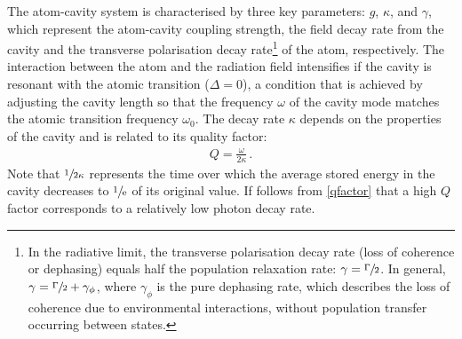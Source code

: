 \documentclass[../Thesis-IJspeert.tex]{subfiles}
\begin{document}
The atom-cavity system is characterised by three key parameters: $g$, $\kappa$, and $\gamma$, which represent the atom-cavity coupling strength, the field decay rate from the cavity and the transverse polarisation decay rate\footnote{In the radiative limit, the transverse polarisation decay rate (loss of coherence or dephasing) equals half the population relaxation rate: $\gamma=\sfrac{\Gamma}{2}$. In general, $\gamma=\sfrac{\Gamma}{2}+\gamma_\phi$, where $\gamma_\phi$ is the pure dephasing rate, which describes the loss of coherence due to environmental interactions, without population transfer occurring between states.} of the atom, respectively. The interaction between the atom and the radiation field intensifies if the cavity is resonant with the atomic transition ($\Delta=0$), a condition that is achieved by adjusting the cavity length so that the frequency $\omega$ of the cavity mode matches the atomic transition frequency $\omega_0$. The decay rate $\kappa$ depends on the properties of the cavity and is related to its quality factor:
\begin{align}
\label{qfactor}
	Q = \frac{\omega}{2\kappa}\,.
\end{align}
Note that $\sfrac{1}{2\kappa}$ represents the time over which the average stored energy in the cavity decreases to $\sfrac{1}{\mathrm{e}}$ of its original value. If follows from \autoref{qfactor} that a high $Q$ factor corresponds to a relatively low photon decay rate.
\end{document}
